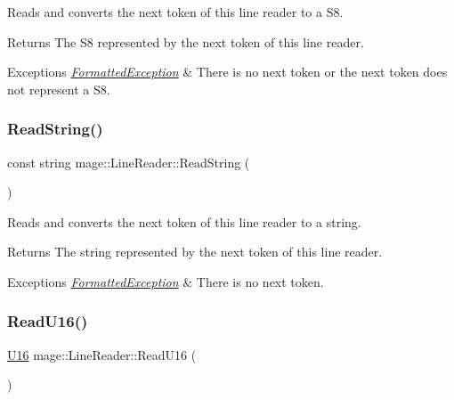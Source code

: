 Reads and converts the next token of this line reader to a {\ttfamily S8}.

\begin{DoxyReturn}{Returns}
The {\ttfamily S8} represented by the next token of this line reader. 
\end{DoxyReturn}

\begin{DoxyExceptions}{Exceptions}
{\em \hyperlink{classmage_1_1_formatted_exception}{Formatted\+Exception}} & There is no next token or the next token does not represent a {\ttfamily S8}. \\
\hline
\end{DoxyExceptions}
\hypertarget{classmage_1_1_line_reader_a58a27b637574ce56ea17a575aa540675}{}\label{classmage_1_1_line_reader_a58a27b637574ce56ea17a575aa540675} 
\subsubsection{\texorpdfstring{Read\+String()}{ReadString()}}
{\footnotesize\ttfamily const string mage\+::\+Line\+Reader\+::\+Read\+String (\begin{DoxyParamCaption}{ }\end{DoxyParamCaption})\hspace{0.3cm}{\ttfamily [protected]}}

Reads and converts the next token of this line reader to a string.

\begin{DoxyReturn}{Returns}
The string represented by the next token of this line reader. 
\end{DoxyReturn}

\begin{DoxyExceptions}{Exceptions}
{\em \hyperlink{classmage_1_1_formatted_exception}{Formatted\+Exception}} & There is no next token. \\
\hline
\end{DoxyExceptions}
\hypertarget{classmage_1_1_line_reader_ac182214e611518cb8b8c1f8cd6b08f0c}{}\label{classmage_1_1_line_reader_ac182214e611518cb8b8c1f8cd6b08f0c} 
\subsubsection{\texorpdfstring{Read\+U16()}{ReadU16()}}
{\footnotesize\ttfamily \hyperlink{namespacemage_af69057eec1ce005c1c3b34ae33486f16}{U16} mage\+::\+Line\+Reader\+::\+Read\+U16 (\begin{DoxyParamCaption}{ }\end{DoxyParamCaption})\hspace{0.3cm}{\ttfamily [protected]}}

